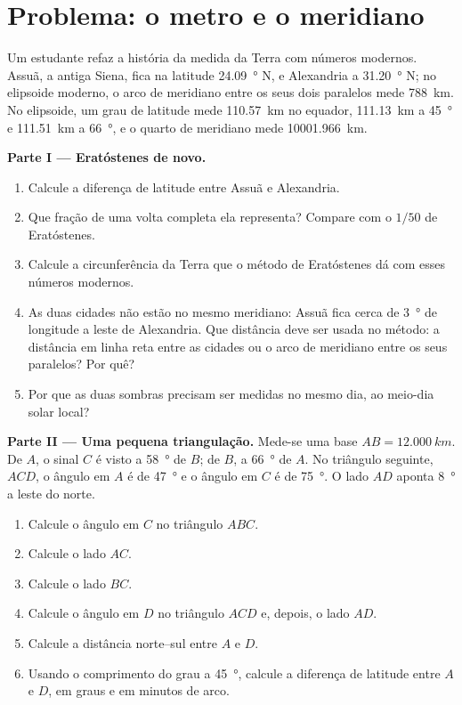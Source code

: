 \section{Problema: o metro e o meridiano}

\begin{problem}
\label{pb:g10:measuring-the-earth:1}
Um estudante refaz a história da medida da Terra com números modernos.
Assuã, a antiga Siena, fica na latitude \qty{24.09}{\degree} N, e
Alexandria a \qty{31.20}{\degree} N; no elipsoide moderno, o arco de
meridiano entre os seus dois paralelos mede \qty{788}{km}. No elipsoide, um
grau de latitude mede \qty{110.57}{km} no equador, \qty{111.13}{km} a
\qty{45}{\degree} e \qty{111.51}{km} a \qty{66}{\degree}, e o quarto de
meridiano mede \qty{10001.966}{km}.

\medskip
\noindent\textbf{Parte I --- Eratóstenes de novo.}
\begin{enumerate}
  \item Calcule a diferença de latitude entre Assuã e Alexandria.
  \item Que fração de uma volta completa ela representa? Compare com o
        $1/50$ de Eratóstenes.
  \item Calcule a circunferência da Terra que o método de Eratóstenes dá
        com esses números modernos.
  \item As duas cidades não estão no mesmo meridiano: Assuã fica cerca de
        \qty{3}{\degree} de longitude a leste de Alexandria. Que distância
        deve ser usada no método: a distância em linha reta entre as
        cidades ou o arco de meridiano entre os seus paralelos? Por quê?
  \item Por que as duas sombras precisam ser medidas no mesmo dia, ao
        meio-dia solar local?
\end{enumerate}

\medskip
\noindent\textbf{Parte II --- Uma pequena triangulação.}
Mede-se uma base $AB = \qty{12.000}{km}$. De $A$, o sinal $C$ é visto a
\qty{58}{\degree} de $B$; de $B$, a \qty{66}{\degree} de $A$. No triângulo
seguinte, $ACD$, o ângulo em $A$ é de \qty{47}{\degree} e o ângulo em $C$
é de \qty{75}{\degree}. O lado $AD$ aponta \qty{8}{\degree} a leste do
norte.
\begin{enumerate}[resume]
  \item Calcule o ângulo em $C$ no triângulo $ABC$.
  \item Calcule o lado $AC$.
  \item Calcule o lado $BC$.
  \item Calcule o ângulo em $D$ no triângulo $ACD$ e, depois, o lado $AD$.
  \item Calcule a distância norte--sul entre $A$ e $D$.
  \item Usando o comprimento do grau a \qty{45}{\degree}, calcule a
        diferença de latitude entre $A$ e $D$, em graus e em minutos de
        arco.
\end{enumerate}


\end{problem}
